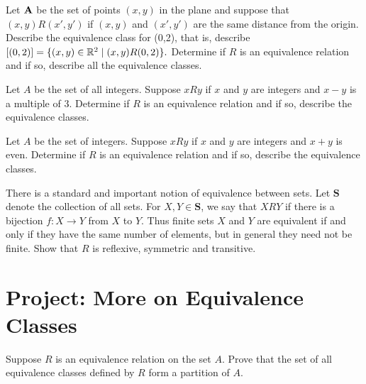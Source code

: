 \begin{prb}
Let $\mathbf A$ be the set of points $(x,y)$ in the plane and suppose that $(x,y) R (x',y')$  if $(x,y)$  and $(x',y')$  are the same distance from the origin.  Describe the equivalence class for (0,2), that is, describe $[(0,2)] = \{ (x,y) \in \mathbb R^2  \mid  (x,y)R(0,2) \}.$ Determine if $R$ is an equivalence relation and if so, describe all the equivalence classes.
\end{prb}

\begin{prb}
Let $A$ be the set of all integers.  Suppose $x R y$ if $x$ and $y$ are integers and $x - y$  is a multiple of  $3$.  Determine if $R$ is an equivalence relation and if so, describe the equivalence classes.
\end{prb}

\begin{prb}
Let $A$ be the set of integers.  Suppose $x R y$ if $x$ and $y$ are integers and $x + y$  is even. Determine if $R$ is an equivalence relation and if so, describe the equivalence classes.
\end{prb}

\begin{prb}
There is a standard and important notion of equivalence between sets. Let $\textbf{S}$ denote the collection of all sets.  For $X, Y \in \textbf{S}$, we say that $X R Y$ if there is a bijection $f:X \to Y$ from $X$ to $Y$.  Thus finite sets $X$ and $Y$ are equivalent if and only if
they have the same number of elements, but in general they need not be finite.  Show that $R$ is reflexive, symmetric and transitive.
\end{prb}

\section{Project: More on Equivalence Classes} \label{projeqclass}

\begin{prb}
Suppose $R$ is an equivalence relation on the set $A$.  Prove that the set of all equivalence classes defined by $R$ form a partition of $A$.
\end{prb}



